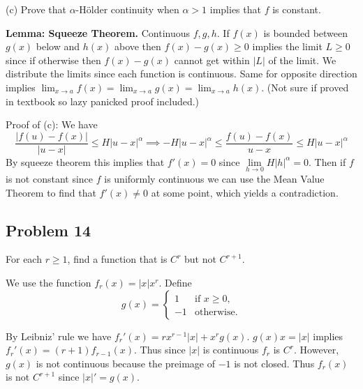 \documentclass{amsart}
\begin{document}
\bigskip

(c) Prove that $\alpha$-H\"{o}lder continuity when $\alpha > 1$ implies that $f$ is constant.

\medskip \noindent \textbf{Lemma: Squeeze Theorem.} Continuous $f, g, h$. If $f(x)$ is bounded between $g(x)$ below and $h(x)$ above then
$f(x)-g(x)\geq0$ implies the limit $L\geq 0$ since if otherwise then $f(x)-g(x)$ cannot get within $|L|$ of the limit. 
We distribute the limits since each function is continuous. Same for opposite direction implies $\lim_{x\rightarrow a} f(x) = \lim_{x\rightarrow a} g(x) = \lim_{x\rightarrow a} h(x)$.
(Not sure if proved in textbook so lazy panicked proof included.)

\medskip \noindent Proof of (c): We have $$\frac{|f(u)-f(x)|}{|u-x|}\leq H|u-x|^{\alpha}\implies -H|u-x|^{\alpha}\leq\frac{f(u)-f(x)}{u-x}\leq H|u-x|^{\alpha}$$ 
By squeeze theorem this implies that $f'(x)=0$ since $\lim\limits_{h\rightarrow 0}H|h|^{\alpha}=0$. Then if $f$ is not constant
since $f$ is uniformly continuous we can use the Mean Value Theorem to find that $f'(x)\neq 0$ at some point, which yields a contradiction.


\newpage
\subsection*{Problem 14} For each $r\geq 1$, find a function that is $C^r$ but not $C^{r+1}$. 

\medskip \noindent We use the function $f_r(x)=|x|x^r$. Define $$g(x)=\begin{cases}
    1 & \text{if } x\geq0, \\
    -1 & \text{otherwise.}
\end{cases}$$

By Leibniz' rule we have $f_r'(x)=rx^{r-1}|x|+x^rg(x)$. $g(x)x=|x|$ implies $f_r'(x)=(r+1)f_{r-1}(x)$. Thus since $|x|$ is continuous
$f_r$ is $C^r$. However, $g(x)$ is not continuous because the preimage of $-1$ is not closed. Thus $f_r(x)$ is not $C^{r+1}$ since $|x|'=g(x)$.
\end{document}
